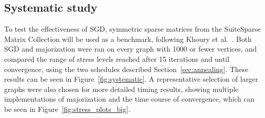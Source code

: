 \subsection{Systematic study}
\label{sec:sgd_experiment}
To test the effectiveness of SGD, symmetric sparse matrices from the SuiteSparse Matrix Collection \cite{Davis2011} will be used as a benchmark, following Khoury et al.\ \cite{Khoury2012}.
Both SGD and majorization were ran on every graph with 1000 or fewer vertices, and compared the range of stress levels reached after 15 iterations and until convergence, using the two schedules described Section~\ref{sec:annealing}. These results can be seen in Figure~\ref{fig:systematic}.
A representative selection of larger graphs were also chosen for more detailed timing results, showing multiple implementations of majorization and the time course of convergence, which can be seen in Figure~\ref{fig:stress_plots_big}.


